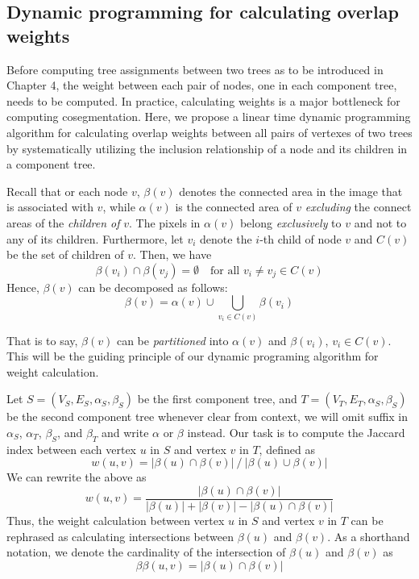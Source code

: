 \subsection{Dynamic programming for calculating overlap weights}
Before computing tree assignments between two trees as to be introduced in Chapter 4, the weight between each pair of nodes, one in each component tree, needs to be computed. In practice, calculating weights is a major bottleneck for computing cosegmentation. Here, we propose a linear time dynamic programming algorithm for calculating overlap weights between all pairs of vertexes of two trees by systematically utilizing the inclusion relationship of a node and its children in a component tree.

Recall that or each node $v$, $\beta(v)$ denotes the connected area in the image that is
associated with $v$, while $\alpha(v)$ is the connected area of $v$
\emph{excluding} the connect areas of the \emph{children of} $v$. The 
pixels in $\alpha(v)$ belong \emph{exclusively} to $v$ and not to any of its
children. Furthermore, let $v_i$ denote the $i$-th child of node $v$ and
$C(v)$ be the set of children of $v$. Then, we have
\begin{equation*} \label{eqn:beta-disjoint}
\beta(v_i)\cap\beta(v_j)=\emptyset\quad\mbox{for all $v_i\neq v_j\in C(v)$}
\end{equation*}
Hence, $\beta(v)$ can be decomposed as follows:
\begin{equation*} \label{eqn:beta-decompose}
\beta(v) = \alpha(v)\cup\bigcup_{v_i \in C(v)} \beta(v_i)   
\end{equation*}

That is to say, $\beta(v)$ can be \emph{partitioned} into $\alpha(v)$ and
$\beta(v_i)$, $v_i \in C(v)$.  This will be the guiding principle of our
dynamic programing algorithm for weight calculation.

Let $S=(V_S,E_S,\alpha_S,\beta_S)$ be the first component tree, and
$T=(V_T,E_T,\alpha_S,\beta_S)$ be the second component tree whenever clear from context, we will omit suffix in $\alpha_S$, $\alpha_T$, $\beta_S$, and $\beta_T$ and write $\alpha$ or $\beta$ instead. Our task is to compute
the Jaccard index between each vertex $u$ in $S$ and vertex $v$ in $T$, defined
as
\begin{equation*}
w(u,v) = |\beta(u) \cap \beta(v)| ~/~ |\beta(u) \cup \beta(v)|
\end{equation*}
We can rewrite the above as
\begin{equation*}\label{eqn:jaccard-rephrase}
w(u,v) = \frac{|\beta(u) \cap \beta(v)|}{|\beta(u)| + |\beta(v)| - |\beta(u) \cap \beta(v)|}
\end{equation*}
Thus, the weight calculation between vertex $u$ in $S$ and vertex $v$ in $T$ can
be rephrased as calculating intersections between $\beta(u)$ and $\beta(v)$. As
a shorthand notation, we denote the cardinality of the intersection of $\beta(u)$
and $\beta(v)$ as
\begin{equation*}
  \label{eqn:betabeta}
  \beta\beta(u,v) = |\beta(u) \cap \beta(v)|  
\end{equation*}

